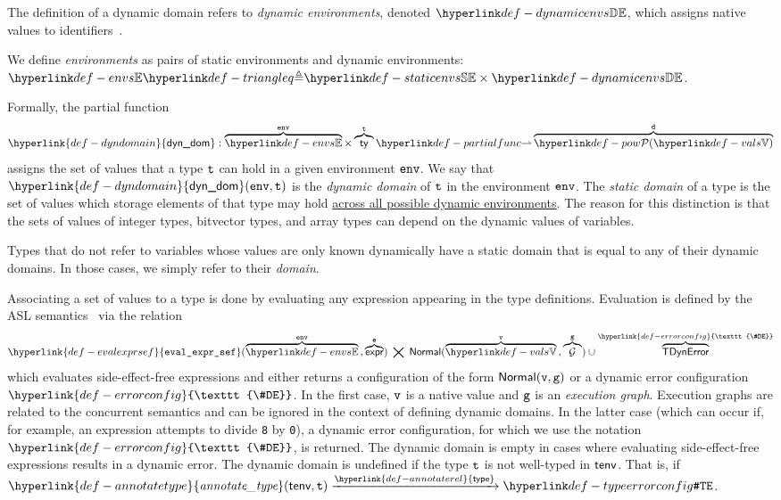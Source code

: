 \documentclass{book}
\newcommand\Normal[0]{\textsf{Normal}}
\newcommand\evalexprsef[1]{\hyperlink{def-evalexprsef}{\texttt{eval\_expr\_sef}}(#1)}
\newcommand\XGraphs[0]{\mathcal{G}}
\newcommand\TError[0]{\textsf{TDynError}}
\newcommand\ErrorConfig[0]{\hyperlink{def-errorconfig}{\texttt{\#DE}}}
\newcommand\annotaterel[0]{\hyperlink{def-annotaterel}{\textsf{type}}}
\newcommand\typearrow[0]{\xrightarrow{\annotaterel}}
\newcommand\dynamicdomain[0]{\hyperlink{def-dyndomain}{\textsf{dyn\_dom}}}
\newcommand\annotatetype[1]{\hyperlink{def-annotatetype}{\textfunc{annotate\_type}}(#1)}
\begin{document}
\hypertarget{def-dynamicenvs}{}
The definition of a dynamic domain refers to \emph{dynamic environments}, denoted $\dynamicenvs$,
which assigns native values to identifiers~\cite{ASLSemanticsReference}.

\hypertarget{def-envs}{}
We define \emph{environments} as pairs of static environments and dynamic environments:
$\envs \triangleq \staticenvs \times \dynamicenvs$.

Formally, the partial function
\[
  \dynamicdomain : \overname{\envs}{\env} \times \overname{\ty}{\vt}
  \partialto \overname{\pow{\vals}}{\vd}
\]
assigns the set of values that a type $\texttt{t}$ can hold in a given environment $\texttt{env}$.
%
We say that $\dynamicdomain(\env, \vt)$ is the \emph{dynamic domain} of $\texttt{t}$
in the environment $\texttt{env}$.
%
The \emph{static domain} of a type is the set of values which storage elements of that type may hold
\underline{across all possible dynamic environments}.
%
The reason for this distinction is that the sets of values
of integer types, bitvector types, and array types can depend on the dynamic values of variables.

Types that do not refer to variables whose values are only known dynamically have
a static domain that is equal to any of their dynamic domains.
In those cases, we simply refer to their \emph{domain}.

Associating a set of values to a type is done by evaluating any expression appearing
in the type definitions. Evaluation is defined by the ASL semantics~\cite{ASLSemanticsReference}
via the relation
\hypertarget{def-evalexprsef}{}
\[
  \evalexprsef{\overname{\envs}{\env} \aslsep \overname{\expr}{\ve}} \;\aslrel\;
  \Normal(\overname{\vals}{\vv}\aslsep\overname{\XGraphs}{\vg}) \cup
  \overname{\TError}{\ErrorConfig}
\]
\hypertarget{def-errorconfig}{}
which evaluates side-effect-free expressions and either returns
a configuration of the form $\Normal(\vv,\vg)$ or a dynamic error configuration $\ErrorConfig$.
In the first case, $\texttt{v}$ is a native value and $\texttt{g}$
is an \emph{execution graph}. Execution graphs are related to the concurrent semantics
and can be ignored in the context of defining dynamic domains.
In the latter case (which can occur if, for example, an expression attempts to divide
\texttt{8} by \texttt{0}), a dynamic error configuration, for which we use the notation
$\ErrorConfig$, is returned.
%
The dynamic domain is empty in cases where evaluating side-effect-free expressions
results in a dynamic error.
%
The dynamic domain is undefined if the type $\texttt{t}$ is not well-typed in $\textsf{tenv}$.
That is, if $\annotatetype{\tenv, \vt} \typearrow \TypeErrorConfig$.
\end{document}
